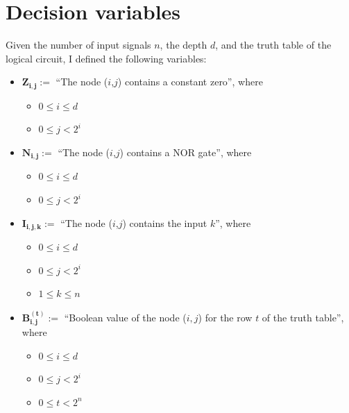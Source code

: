 \documentclass[letterpaper,10pt]{article}
\begin{document}
\section{Decision variables}
Given the number of input signals $n$, the depth $d$, and the truth table of the logical circuit, I defined the following variables:
\begin{itemize}
    \item $\mathbf{Z_{i,j}}:=$ ``The node ($i$,$j$) contains a constant zero'', where
    \begin{itemize}
        \item $0 \leq i \leq d$
        \item $0 \leq j < 2^i$
    \end{itemize}
    \item $\mathbf{N_{i,j}}:=$ ``The node ($i$,$j$) contains a NOR gate'', where
    \begin{itemize}
        \item $0 \leq i \leq d$
        \item $0 \leq j < 2^i$
    \end{itemize}
    \item $\mathbf{I_{i,j,k}}:=$ ``The node ($i$,$j$) contains the input $k$'', where
    \begin{itemize}
        \item $0 \leq i \leq d$
        \item $0 \leq j < 2^i$
        \item $1 \leq k \leq n$
    \end{itemize}
    \item $\mathbf{B_{i,j}^{(t)}}:=$ ``Boolean value of the node ($i,j$) for the row $t$ of the truth table'', where
    \begin{itemize}
        \item $0 \leq i \leq d$
        \item $0 \leq j < 2^i$
        \item $0 \leq t < 2^n$
    \end{itemize}
\end{itemize}
\end{document}
